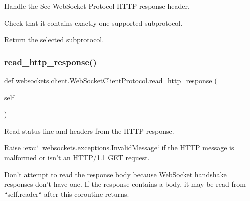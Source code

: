 \begin{DoxyVerb}Handle the Sec-WebSocket-Protocol HTTP response header.

Check that it contains exactly one supported subprotocol.

Return the selected subprotocol.\end{DoxyVerb}
 \mbox{\label{classwebsockets_1_1client_1_1_web_socket_client_protocol_a732337785ebbdabc1202cf4535ebae8f}} 
\subsubsection{\texorpdfstring{read\+\_\+http\+\_\+response()}{read\_http\_response()}}
{\footnotesize\ttfamily def websockets.\+client.\+Web\+Socket\+Client\+Protocol.\+read\+\_\+http\+\_\+response (\begin{DoxyParamCaption}\item[{}]{self }\end{DoxyParamCaption})}

\begin{DoxyVerb}Read status line and headers from the HTTP response.

Raise :exc:`~websockets.exceptions.InvalidMessage` if the HTTP message
is malformed or isn't an HTTP/1.1 GET request.

Don't attempt to read the response body because WebSocket handshake
responses don't have one. If the response contains a body, it may be
read from ``self.reader`` after this coroutine returns.\end{DoxyVerb}
 \mbox{\label{classwebsockets_1_1client_1_1_web_socket_client_protocol_a9e0266ebfc4d025fa7c2ddb664e4b71d}} 
